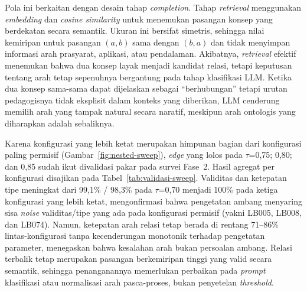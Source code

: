 \documentclass[../../thesis]{subfiles}
\begin{document}
Pola ini berkaitan dengan desain tahap \textit{completion}. Tahap
\textit{retrieval} menggunakan \textit{embedding} dan \textit{cosine similarity}
untuk menemukan pasangan konsep yang berdekatan secara semantik. Ukuran ini
bersifat simetris, sehingga nilai kemiripan untuk pasangan $(a,b)$ sama dengan
$(b,a)$ dan tidak menyimpan informasi arah prasyarat, aplikasi, atau pendalaman.
Akibatnya, \textit{retrieval} efektif menemukan bahwa dua konsep layak menjadi
kandidat relasi, tetapi keputusan tentang arah tetap sepenuhnya bergantung pada
tahap klasifikasi LLM. Ketika dua konsep sama-sama dapat dijelaskan sebagai
``berhubungan'' tetapi urutan pedagogisnya tidak eksplisit dalam konteks yang
diberikan, LLM cenderung memilih arah yang tampak natural secara naratif,
meskipun arah ontologis yang diharapkan adalah sebaliknya.

Karena konfigurasi yang lebih ketat merupakan himpunan bagian dari
konfigurasi paling permisif (Gambar~\ref{fig:nested-sweep}), \textit{edge}
yang lolos pada $\tau$=0{,}75; 0{,}80; dan 0{,}85 sudah ikut
divalidasi pakar pada survei Fase~2. Hasil agregat per
konfigurasi disajikan pada Tabel~\ref{tab:validasi-sweep}.
Validitas dan ketepatan tipe meningkat dari 99{,}1\% / 98{,}3\%
pada $\tau$=0{,}70 menjadi 100\% pada ketiga konfigurasi yang lebih
ketat, mengonfirmasi bahwa pengetatan ambang menyaring sisa
\textit{noise} validitas/tipe yang ada pada konfigurasi permisif (yakni
LB005, LB008, dan LB074). Namun, ketepatan arah relasi tetap berada di
rentang 71--86\% lintas-konfigurasi tanpa kecenderungan monotonik
terhadap pengetatan parameter, menegaskan bahwa kesalahan arah bukan
persoalan ambang. Relasi terbalik tetap merupakan pasangan
berkemiripan tinggi yang valid secara semantik, sehingga
penanganannya memerlukan perbaikan pada \textit{prompt} klasifikasi
atau normalisasi arah pasca-proses, bukan penyetelan
\textit{threshold}.
\end{document}
